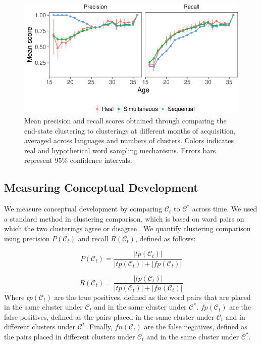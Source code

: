 \documentclass[11pt]{article}
\newenvironment{CodeChunk}{}{}
\begin{document}
\begin{CodeChunk}
\captionsetup{width=0.8\textwidth}\begin{figure}[h]

{\centering \includegraphics{figs/results-1} 

}

\caption[Mean precision and recall scores obtained through comparing the end-state clustering to clusterings at different months of acquisition, averaged across languages and numbers of clusters]{Mean precision and recall scores obtained through comparing the end-state clustering to clusterings at different months of acquisition, averaged across languages and numbers of clusters. Colors indicates real and hypothetical word sampling mechanisms. Errors bars represent 95\% confidence intervals.}\label{fig:results}
\end{figure}
\end{CodeChunk}

\subsection{Measuring Conceptual
Development}\label{measuring-conceptual-development}

We measure conceptual development by comparing \(\mathcal{C}_t\) to
\(\mathcal{C}^*\) across time. We used a standard method in clustering
comparison, which is based on word pairs on which the two clusterings
agree or disagree \cite{rand1971,hubert1985}. We quantify clustering
comparison using precision \(P(\mathcal{C}_t)\) and recall
\(R(\mathcal{C}_t)\), defined as follows:

\[
P(\mathcal{C}_t) = \frac{|tp(\mathcal{C}_t)|}{|tp(\mathcal{C}_t)| + |fp(\mathcal{C}_t)|}
\]

\[
R(\mathcal{C}_t) = \frac{|tp(\mathcal{C}_t)|}{|tp(\mathcal{C}_t)| + |fn(\mathcal{C}_t)|}
\] Where \(tp(\mathcal{C}_t)\) are the true positives, defined as the
word pairs that are placed in the same cluster under \(\mathcal{C}_t\)
and in the same cluster under \(\mathcal{C}^*\). \(fp(\mathcal{C}_t)\)
are the false positives, defined as the pairs placed in the same cluster
under \(\mathcal{C}_t\) and in different clusters under
\(\mathcal{C}^*\). Finally, \(fn(\mathcal{C}_t)\) are the false
negatives, defined as the pairs placed in different clusters under
\(\mathcal{C}_t\) and in the same cluster under \(\mathcal{C}^*\).
\end{document}
